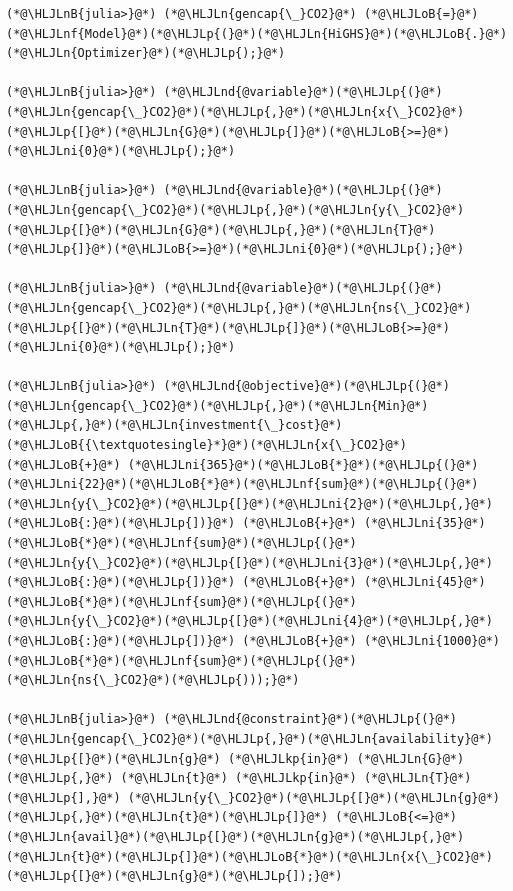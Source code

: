 \documentclass[12pt,a4paper]{article}
\newcommand{\HLJLkp}[1]{\textcolor[RGB]{148,91,176}{\textbf{#1}}}
\newcommand{\HLJLn}[1]{#1}
\newcommand{\HLJLnd}[1]{\textcolor[RGB]{214,102,97}{#1}}
\newcommand{\HLJLnf}[1]{\textcolor[RGB]{66,102,213}{#1}}
\newcommand{\HLJLnB}[1]{\textcolor[RGB]{59,151,46}{#1}}
\newcommand{\HLJLni}[1]{\textcolor[RGB]{59,151,46}{#1}}
\newcommand{\HLJLoB}[1]{\textcolor[RGB]{102,102,102}{\textbf{#1}}}
\newcommand{\HLJLp}[1]{#1}
\begin{document}
\begin{lstlisting}
(*@\HLJLnB{julia>}@*) (*@\HLJLn{gencap{\_}CO2}@*) (*@\HLJLoB{=}@*) (*@\HLJLnf{Model}@*)(*@\HLJLp{(}@*)(*@\HLJLn{HiGHS}@*)(*@\HLJLoB{.}@*)(*@\HLJLn{Optimizer}@*)(*@\HLJLp{);}@*)

(*@\HLJLnB{julia>}@*) (*@\HLJLnd{@variable}@*)(*@\HLJLp{(}@*)(*@\HLJLn{gencap{\_}CO2}@*)(*@\HLJLp{,}@*)(*@\HLJLn{x{\_}CO2}@*)(*@\HLJLp{[}@*)(*@\HLJLn{G}@*)(*@\HLJLp{]}@*)(*@\HLJLoB{>=}@*)(*@\HLJLni{0}@*)(*@\HLJLp{);}@*)

(*@\HLJLnB{julia>}@*) (*@\HLJLnd{@variable}@*)(*@\HLJLp{(}@*)(*@\HLJLn{gencap{\_}CO2}@*)(*@\HLJLp{,}@*)(*@\HLJLn{y{\_}CO2}@*)(*@\HLJLp{[}@*)(*@\HLJLn{G}@*)(*@\HLJLp{,}@*)(*@\HLJLn{T}@*)(*@\HLJLp{]}@*)(*@\HLJLoB{>=}@*)(*@\HLJLni{0}@*)(*@\HLJLp{);}@*)

(*@\HLJLnB{julia>}@*) (*@\HLJLnd{@variable}@*)(*@\HLJLp{(}@*)(*@\HLJLn{gencap{\_}CO2}@*)(*@\HLJLp{,}@*)(*@\HLJLn{ns{\_}CO2}@*)(*@\HLJLp{[}@*)(*@\HLJLn{T}@*)(*@\HLJLp{]}@*)(*@\HLJLoB{>=}@*)(*@\HLJLni{0}@*)(*@\HLJLp{);}@*)

(*@\HLJLnB{julia>}@*) (*@\HLJLnd{@objective}@*)(*@\HLJLp{(}@*)(*@\HLJLn{gencap{\_}CO2}@*)(*@\HLJLp{,}@*)(*@\HLJLn{Min}@*)(*@\HLJLp{,}@*)(*@\HLJLn{investment{\_}cost}@*)(*@\HLJLoB{{\textquotesingle}*}@*)(*@\HLJLn{x{\_}CO2}@*) (*@\HLJLoB{+}@*) (*@\HLJLni{365}@*)(*@\HLJLoB{*}@*)(*@\HLJLp{(}@*)(*@\HLJLni{22}@*)(*@\HLJLoB{*}@*)(*@\HLJLnf{sum}@*)(*@\HLJLp{(}@*)(*@\HLJLn{y{\_}CO2}@*)(*@\HLJLp{[}@*)(*@\HLJLni{2}@*)(*@\HLJLp{,}@*)(*@\HLJLoB{:}@*)(*@\HLJLp{])}@*) (*@\HLJLoB{+}@*) (*@\HLJLni{35}@*)(*@\HLJLoB{*}@*)(*@\HLJLnf{sum}@*)(*@\HLJLp{(}@*)(*@\HLJLn{y{\_}CO2}@*)(*@\HLJLp{[}@*)(*@\HLJLni{3}@*)(*@\HLJLp{,}@*)(*@\HLJLoB{:}@*)(*@\HLJLp{])}@*) (*@\HLJLoB{+}@*) (*@\HLJLni{45}@*)(*@\HLJLoB{*}@*)(*@\HLJLnf{sum}@*)(*@\HLJLp{(}@*)(*@\HLJLn{y{\_}CO2}@*)(*@\HLJLp{[}@*)(*@\HLJLni{4}@*)(*@\HLJLp{,}@*)(*@\HLJLoB{:}@*)(*@\HLJLp{])}@*) (*@\HLJLoB{+}@*) (*@\HLJLni{1000}@*)(*@\HLJLoB{*}@*)(*@\HLJLnf{sum}@*)(*@\HLJLp{(}@*)(*@\HLJLn{ns{\_}CO2}@*)(*@\HLJLp{)));}@*)

(*@\HLJLnB{julia>}@*) (*@\HLJLnd{@constraint}@*)(*@\HLJLp{(}@*)(*@\HLJLn{gencap{\_}CO2}@*)(*@\HLJLp{,}@*)(*@\HLJLn{availability}@*)(*@\HLJLp{[}@*)(*@\HLJLn{g}@*) (*@\HLJLkp{in}@*) (*@\HLJLn{G}@*)(*@\HLJLp{,}@*) (*@\HLJLn{t}@*) (*@\HLJLkp{in}@*) (*@\HLJLn{T}@*)(*@\HLJLp{],}@*) (*@\HLJLn{y{\_}CO2}@*)(*@\HLJLp{[}@*)(*@\HLJLn{g}@*)(*@\HLJLp{,}@*)(*@\HLJLn{t}@*)(*@\HLJLp{]}@*) (*@\HLJLoB{<=}@*) (*@\HLJLn{avail}@*)(*@\HLJLp{[}@*)(*@\HLJLn{g}@*)(*@\HLJLp{,}@*)(*@\HLJLn{t}@*)(*@\HLJLp{]}@*)(*@\HLJLoB{*}@*)(*@\HLJLn{x{\_}CO2}@*)(*@\HLJLp{[}@*)(*@\HLJLn{g}@*)(*@\HLJLp{]);}@*)


\end{lstlisting}
\end{document}
